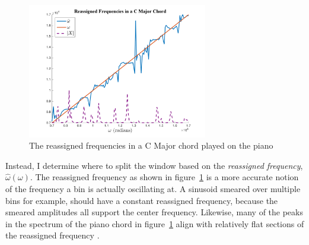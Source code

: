 \documentclass[12pt]{article}
\begin{document}
\begin{figure}[!h]
  \begin{center}
  \includegraphics[width=0.7\textwidth]{figures/ReassignedFreqCMaj}
  \caption{The reassigned frequencies in a C Major chord played on the piano}
  \label{fig:reassignedfrequency}
\end{center}
\end{figure}

Instead, I determine where to split the window based on the \emph{reassigned frequency}, $\hat{\omega}(\omega)$.
The reassigned frequency as shown in figure~\ref{fig:reassignedfrequency} 
is a more accurate notion of the frequency a bin is actually oscillating at.
A sinusoid smeared over multiple bins for example, should have a constant reassigned frequency, because the smeared amplitudes all support the center frequency.
Likewise, many of the peaks in the spectrum of the piano chord in figure~\ref{fig:reassignedfrequency} align with relatively flat sections of the reassigned frequency
\cite{reassignment}.
\end{document}
